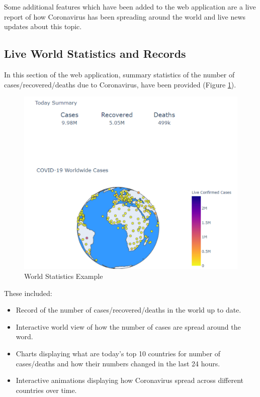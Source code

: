Some additional features which have been added to the web application are a live report of how Coronavirus has been spreading around the world and live news updates about this topic.

\subsection{Live World Statistics and Records}

In this section of the web application, summary statistics of the number of cases/recovered/deaths due to Coronavirus, have been provided (Figure \ref{world}). 

\begin{figure}[ht!]%
    \centering
    \includegraphics[width=0.75\linewidth]{latex/images/world.pdf}
    \caption{World Statistics Example}
    \label{world}
\end{figure}

These included:

\begin{itemize}
    \setlength\itemsep{-0.3cm}
    \item Record of the number of cases/recovered/deaths in the world up to date.
    \item Interactive world view of how the number of cases are spread around the word.
    \item Charts displaying what are today's top 10 countries for number of cases/deaths and how their numbers changed in the last 24 hours.
    \item Interactive animations displaying how Coronavirus spread across different countries over time.
\end{itemize}

